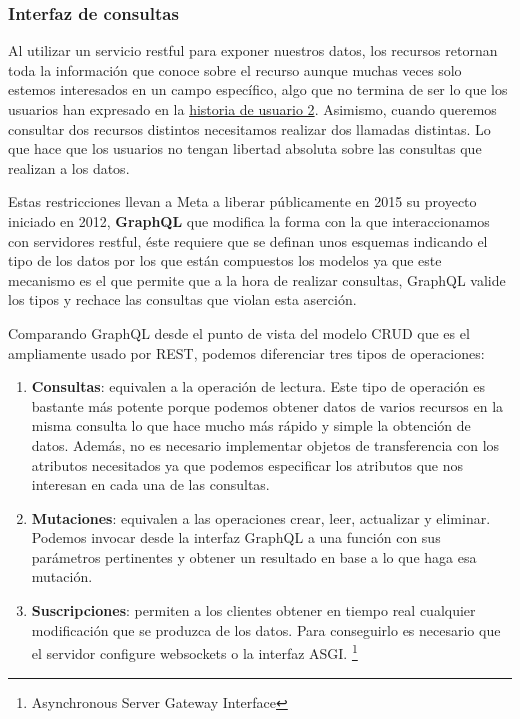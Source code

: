 \subsubsection{Interfaz de consultas}
Al utilizar un servicio restful para exponer nuestros datos, los recursos retornan toda
la información que conoce sobre el recurso aunque muchas veces solo estemos interesados en
un campo específico, algo que no termina de ser lo que los usuarios han expresado en la
\hyperref[sec:hu2]{historia de usuario 2}. Asimismo, cuando queremos consultar dos
recursos distintos necesitamos realizar dos llamadas distintas. Lo que hace que los
usuarios no tengan libertad absoluta sobre las consultas que realizan a los datos.

Estas restricciones llevan a Meta a liberar públicamente en 2015 su proyecto iniciado en 2012,
\textbf{GraphQL} que modifica la forma con la que interaccionamos con servidores restful,
éste requiere que se definan unos esquemas indicando el tipo de los datos por los que
están compuestos los modelos ya que este mecanismo es el que permite que a la hora de
realizar consultas, GraphQL valide los tipos y rechace las consultas que violan esta
aserción.

Comparando GraphQL desde el punto de vista del modelo CRUD que es el ampliamente usado por
REST, podemos diferenciar tres tipos de operaciones:
\begin{enumerate}
    \item \textbf{Consultas}: equivalen a la operación de lectura. Este tipo de operación
    es bastante más potente porque podemos obtener datos de varios recursos en la misma
    consulta lo que hace mucho más rápido y simple la obtención de datos. Además, no es
    necesario implementar objetos de transferencia con los atributos necesitados ya que
    podemos especificar los atributos que nos interesan en cada una de las consultas.
    \item \textbf{Mutaciones}: equivalen a las operaciones crear, leer, actualizar y
    eliminar. Podemos invocar desde la interfaz GraphQL a una función con sus parámetros
    pertinentes y obtener un resultado en base a lo que haga esa mutación.
    \item \textbf{Suscripciones}: permiten a los clientes obtener en tiempo real cualquier
    modificación que se produzca de los datos. Para conseguirlo es necesario que el
    servidor configure websockets o la interfaz ASGI. \footnote{Asynchronous Server
    Gateway Interface}
\end{enumerate}

